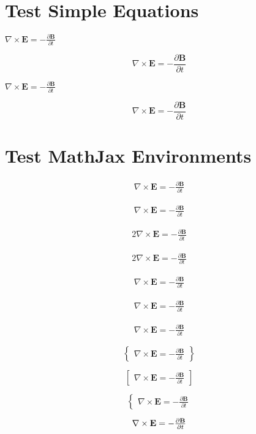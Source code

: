 \documentclass{article}
\begin{document}
\newcommand\example{\nabla \times \mathbf{E} = - \frac{\partial \mathbf{B}}{\partial t}}

\section{Test Simple Equations}

$\example$

$$\example$$

\(\example\)

\[\example\]

\section{Test MathJax Environments}

\begin{align}
\example
\end{align}

\begin{align*}
\example
\end{align*}

\begin{alignat}{2}
\example
\end{alignat}

\begin{alignat*}{2}
\example
\end{alignat*}

\[
\begin{aligned}
\example
\end{aligned}
\]

\[
\begin{alignedat}{2}
\example
\end{alignedat}
\]

\[
\begin{array}{lcl}
\example
\end{array}
\]

\[
\begin{Bmatrix}
\example
\end{Bmatrix}
\]

\[
\begin{bmatrix}
\example
\end{bmatrix}
\]

\[
\begin{cases}
\example
\end{cases}
\]

\[
\begin{CD}
\example
\end{CD}
\]
\end{document}
